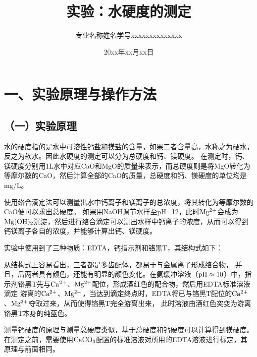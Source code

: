 \documentclass[a4paper,12pt]{article}
\title{\heiti\zihao{2} 实验：水硬度的测定}
\author{专业名称\quad 姓\;名\quad 学号xxxxxxxxxxxxxx}
\date{20xx年xx月xx日}
\renewcommand{\normalsize}{\fontsize{12pt}{18pt}\selectfont}
\begin{document}
\maketitle

\section*{一、实验原理与操作方法}
\subsection*{（一）实验原理}

水的硬度指的是水中可溶性钙盐和镁盐的含量，如果二者含量高，水称之为硬水，反之为软水。因此水硬度的测定可以分为总硬度和钙、镁硬度。
在测定时，钙、镁硬度分别用1L水中对应CaO和MgO的质量来表示，而总硬度则是将MgO转化为等摩尔数的CaO，然后计算全部的CaO的质量，总硬度和钙、镁硬度的单位均是mg/L。

使用络合滴定法可以测量出水中钙离子和镁离子的总浓度，将其转化为等摩尔数的CaO便可以求出总硬度。
如果用NaOH调节水样至pH=12，此时$\rm Mg^{2+}$会成为$\rm Mg(OH)_2$沉淀，然后进行络合滴定可以测出水样中钙离子的浓度，从而可以得到钙镁离子各自的浓度，并能够计算出钙、镁硬度。

实验中使用到了三种物质：EDTA，钙指示剂和铬黑T，其结构式如下：

\bigskip
\scriptsize
{}
\quad
{}
\quad
{}
\normalsize
\medskip

从结构式上容易看出，三者都是多齿配体，都易于与金属离子形成络合物，
并且，后两者具有颜色，还能有明显的颜色变化。在氨缓冲溶液（$\rm pH\approx 10$）中，指示剂铬黑T先与$\rm Ca^{2+}$、$\rm Mg^{2+}$配位，形成酒红色的配合物，然后用EDTA标准溶液滴定
游离的$\rm Ca^{2+}$、$\rm Mg^{2+}$，当达到滴定终点时，EDTA将已与铬黑T配位的$\rm Ca^{2+}$、$\rm Mg^{2+}$夺取过来，从而使得铬黑T完全游离出来，
此时溶液由酒红色突变为游离铬黑T本身的纯蓝色\textsuperscript{\cite{SSCG202408002}}。

测量钙硬度的原理与测量总硬度类似，基于总硬度和钙硬度可以计算得到镁硬度。在测定之前，需要使用$\rm CaCO_3$配置的标准溶液对所用的EDTA溶液进行标定，其原理与前面相同。
\end{document}
